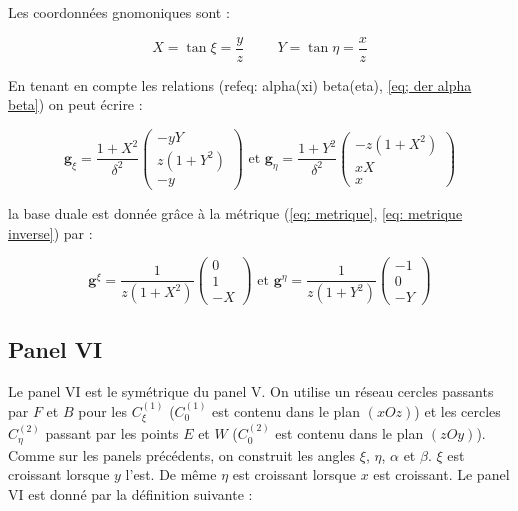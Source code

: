 Les coordonnées gnomoniques sont :

\begin{equation}
X = \tan \xi = \dfrac{y}{z} \hspace{1cm} Y = \tan \eta = \dfrac{x}{z}
\end{equation}

En tenant en compte les relations (ref{eq: alpha(xi) beta(eta)}, \ref{eq; der alpha beta}) on peut écrire : 

\begin{equation}
\mathbf{g}_{\xi} = \dfrac{1+X^2}{\delta^2} \begin{pmatrix}
-yY \\ z(1+Y^2) \\ -y
\end{pmatrix} \text{ et } \mathbf{g}_{\eta} = \dfrac{1+Y^2}{\delta^2} \begin{pmatrix}
-z(1+X^2) \\ xX \\ x
\end{pmatrix}
\label{eq: base locale V}
\end{equation}

la base duale est donnée grâce à la métrique (\ref{eq: metrique}, \ref{eq: metrique inverse}) par :

\begin{equation}
\mathbf{g}^{\xi} = \dfrac{1}{z(1+X^2)}\begin{pmatrix}
0 \\ 1 \\ -X
\end{pmatrix} \text{ et } \mathbf{g}^{\eta} = \dfrac{1}{z(1+Y^2)}\begin{pmatrix}
-1 \\ 0 \\ -Y
\end{pmatrix}
\label{eq: base duale V}
\end{equation}



\subsection{Panel VI}

Le panel VI est le symétrique du panel V. On utilise un réseau cercles passants par $F$ et $B$ pour les $C_{\xi}^{(1)}$ ($C_{0}^{(1)}$ est contenu dans le plan $(xOz)$) et les cercles $C_{\eta}^{(2)}$ passant par les points $E$ et $W$ ($C_{0}^{(2)}$ est contenu dans le plan $(zOy)$). Comme sur les panels précédents, on construit les angles $\xi$, $\eta$, $\alpha$ et $\beta$. $\xi$ est croissant lorsque $y$ l'est. De même $\eta$ est croissant lorsque $x$ est croissant.
Le panel VI est donné par la définition suivante :

